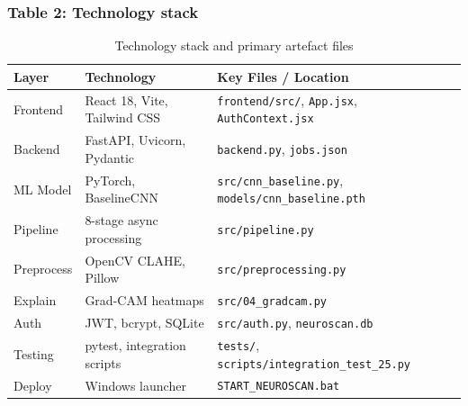 \documentclass[11pt,a4paper]{article}
\begin{document}
\subsubsection{Table 2: Technology stack}
\begin{table}[H]
\centering
\caption{Technology stack and primary artefact files}
\label{tab:techstack}
\small
\begin{tabular}{|l|l|p{7.2cm}|}
\hline
\textbf{Layer} & \textbf{Technology} & \textbf{Key Files / Location} \\
\hline
Frontend   & React 18, Vite, Tailwind CSS & \texttt{frontend/src/}, \texttt{App.jsx}, \texttt{AuthContext.jsx} \\
\hline
Backend    & FastAPI, Uvicorn, Pydantic   & \texttt{backend.py}, \texttt{jobs.json} \\
\hline
ML Model   & PyTorch, BaselineCNN         & \texttt{src/cnn\_baseline.py}, \texttt{models/cnn\_baseline.pth} \\
\hline
Pipeline   & 8-stage async processing     & \texttt{src/pipeline.py} \\
\hline
Preprocess & OpenCV CLAHE, Pillow         & \texttt{src/preprocessing.py} \\
\hline
Explain    & Grad-CAM heatmaps            & \texttt{src/04\_gradcam.py} \\
\hline
Auth       & JWT, bcrypt, SQLite          & \texttt{src/auth.py}, \texttt{neuroscan.db} \\
\hline
Testing    & pytest, integration scripts  & \texttt{tests/}, \texttt{scripts/integration\_test\_25.py} \\
\hline
Deploy     & Windows launcher             & \texttt{START\_NEUROSCAN.bat} \\
\hline
\end{tabular}
\end{table}
\end{document}
